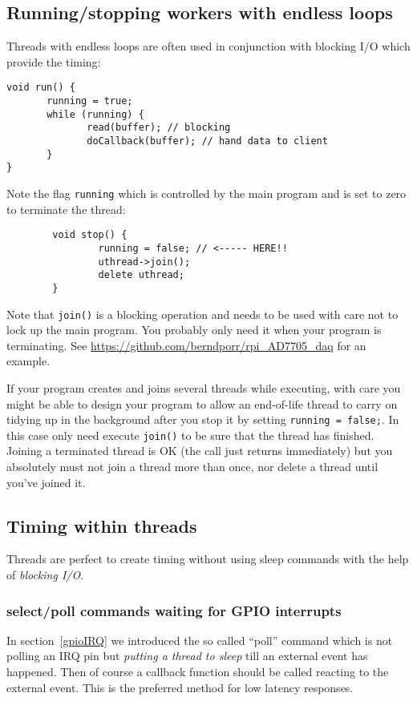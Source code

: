 \documentclass[12pt]{report}
\begin{document}
\subsection{Running/stopping workers with endless loops}
Threads with endless loops are often used in conjunction with blocking
I/O which provide the timing:
\begin{verbatim}
void run() {
       running = true;
       while (running) {
              read(buffer); // blocking
              doCallback(buffer); // hand data to client
       }
}
\end{verbatim}
Note the flag \texttt{running} which is controlled by the main program and is set to zero to terminate
the thread:
\begin{verbatim}
        void stop() {
                running = false; // <----- HERE!!
                uthread->join();
                delete uthread;
        }
\end{verbatim}
Note that \texttt{join()} is a blocking operation and needs to be used with care not to
lock up the main program. You probably only need it when your program is terminating.
See \url{https://github.com/berndporr/rpi_AD7705_daq} for an example.

If your program creates and joins several threads while executing,
with care you might be able to design your program to allow an
end-of-life thread to carry on
tidying up in the background after you stop it by setting \texttt{running = false;}.
In this case only need execute \texttt{join()} to be sure that
the thread has finished. Joining a terminated thread is OK
(the call just returns immediately)
but you absolutely  must not join a thread more than once,
nor delete a thread until you've joined it.


\subsection{Timing within threads}
Threads are perfect to create timing without using sleep commands
with the help of \textsl{blocking I/O}.

\subsubsection{select/poll commands waiting for GPIO interrupts}
In section~\ref{gpioIRQ} we introduced the so called ``poll'' command
which is not polling an IRQ pin but \textsl{putting a thread to sleep} till an
external event has happened. Then of course a callback function should
be called reacting to the external event. This is the preferred method
for low latency responses.
\end{document}
